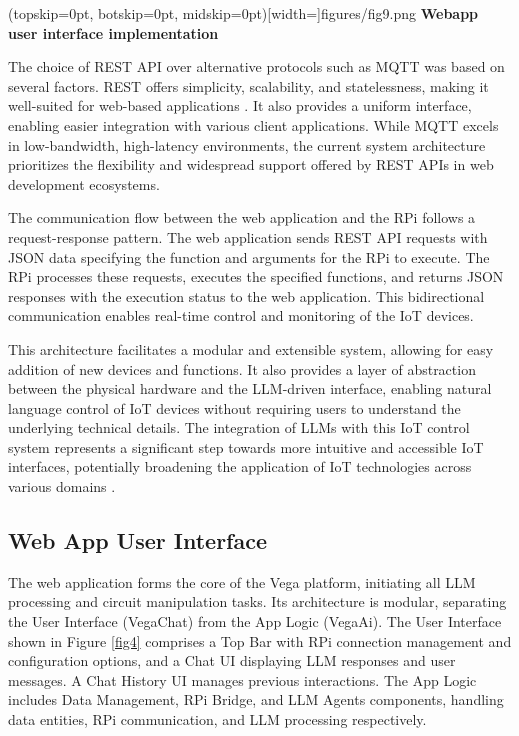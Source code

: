 \documentclass{ieeeaccess}
\begin{document}
\Figure[t!](topskip=0pt, botskip=0pt,
midskip=0pt)[width=\textwidth]{{figures/fig9.png}}
{ \textbf{Webapp user interface implementation}\label{fig4}}

The choice of REST API over alternative protocols such as MQTT was based on several factors. REST offers simplicity, scalability, and statelessness, making it well-suited for web-based applications \cite{s21206904}. It also provides a uniform interface, enabling easier integration with various client applications. While MQTT excels in low-bandwidth, high-latency environments, the current system architecture prioritizes the flexibility and widespread support offered by REST APIs in web development ecosystems.


The communication flow between the web application and the RPi follows a request-response pattern. The web application sends REST API requests with JSON data specifying the function and arguments for the RPi to execute. The RPi processes these requests, executes the specified functions, and returns JSON responses with the execution status to the web application. This bidirectional communication enables real-time control and monitoring of the IoT devices.

This architecture facilitates a modular and extensible system, allowing for easy addition of new devices and functions. It also provides a layer of abstraction between the physical hardware and the LLM-driven interface, enabling natural language control of IoT devices without requiring users to understand the underlying technical details. The integration of LLMs with this IoT control system represents a significant step towards more intuitive and accessible IoT interfaces, potentially broadening the application of IoT technologies across various domains \cite{taylor2010software}.

\subsection{Web App User Interface}

The web application forms the core of the Vega platform, initiating all LLM processing and circuit manipulation tasks. Its architecture is modular, separating the User Interface (VegaChat) from the App Logic (VegaAi). The User Interface shown in Figure \ref{fig4} comprises a Top Bar with RPi connection management and configuration options, and a Chat UI displaying LLM responses and user messages. A Chat History UI manages previous interactions. The App Logic includes Data Management, RPi Bridge, and LLM Agents components, handling data entities, RPi communication, and LLM processing respectively.
\end{document}
